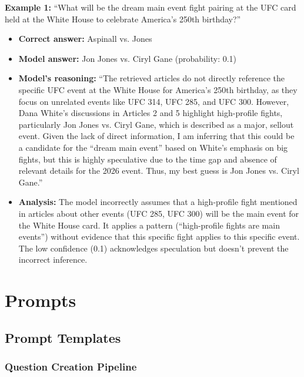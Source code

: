 \documentclass{article} %
\begin{document}
\textbf{Example 1:} ``What will be the dream main event fight pairing at the UFC card held at the White House to celebrate America's 250th birthday?''

\begin{itemize}
\item \textbf{Correct answer:} Aspinall vs. Jones
\item \textbf{Model answer:} Jon Jones vs. Ciryl Gane (probability: 0.1)
\item \textbf{Model's reasoning:} ``The retrieved articles do not directly reference the specific UFC event at the White House for America's 250th birthday, as they focus on unrelated events like UFC 314, UFC 285, and UFC 300. However, Dana White's discussions in Articles 2 and 5 highlight high-profile fights, particularly Jon Jones vs. Ciryl Gane, which is described as a major, sellout event. Given the lack of direct information, I am inferring that this could be a candidate for the ``dream main event'' based on White's emphasis on big fights, but this is highly speculative due to the time gap and absence of relevant details for the 2026 event. Thus, my best guess is Jon Jones vs. Ciryl Gane.''
\item \textbf{Analysis:} The model incorrectly assumes that a high-profile fight mentioned in articles about other events (UFC 285, UFC 300) will be the main event for the White House card. It applies a pattern (``high-profile fights are main events'') without evidence that this specific fight applies to this specific event. The low confidence (0.1) acknowledges speculation but doesn't prevent the incorrect inference.
\end{itemize}
\fi 


\clearpage
\section{Prompts}
\label{sec:prompts}

\subsection{Prompt Templates}
\label{sec:prompt_templates}

\subsubsection{Question Creation Pipeline}
\end{document}
